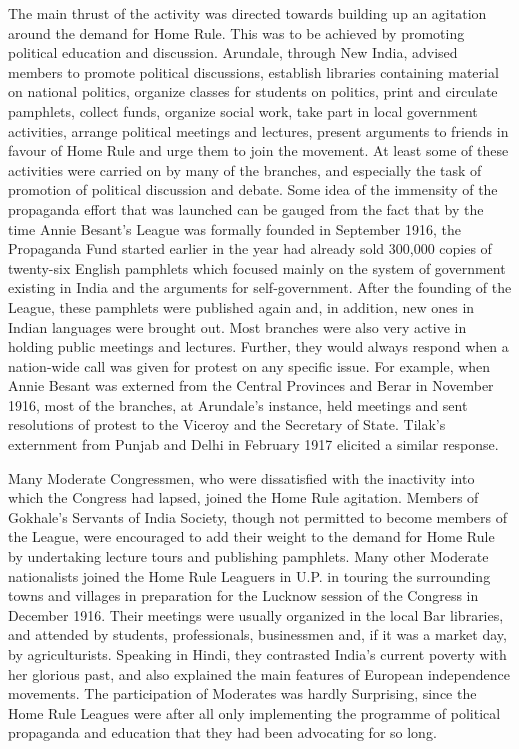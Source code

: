 The main thrust of the activity was directed towards building up an agitation around the demand for Home Rule. This was to be achieved by promoting political education and discussion. Arundale, through New India, advised members to promote political discussions, establish libraries containing material on national politics, organize classes for students on politics, print and circulate pamphlets, collect funds, organize social work, take part in local government activities, arrange political meetings and lectures, present arguments to friends in favour of Home Rule and urge them to join the movement. At least some of these activities were carried on by many of the branches, and especially the task of promotion of political discussion and debate. Some idea of the immensity of the propaganda effort that was launched can be gauged from the fact that by the time Annie Besant's League was formally founded in September 1916, the Propaganda Fund started earlier in the year had already sold 300,000 copies of twenty-six English pamphlets which focused mainly on the system of government existing in India and the arguments for self-government. After the founding of the League, these pamphlets were published again and, in addition, new ones in Indian languages were brought out. Most branches were also very active in holding public meetings and lectures. Further, they would always respond when a nation-wide call was given for protest on any specific issue. For example, when Annie Besant was externed from the Central Provinces and Berar in November 1916, most of the branches, at Arundale's instance, held meetings and sent resolutions of protest to the Viceroy and the Secretary of State. Tilak's externment from Punjab and Delhi in February 1917 elicited a similar response.

Many Moderate Congressmen, who were dissatisfied with the inactivity into which the Congress had lapsed, joined the Home Rule agitation. Members of Gokhale's Servants of India Society, though not permitted to become members of the League, were encouraged to add their weight to the demand for Home Rule by undertaking lecture tours and publishing pamphlets. Many other Moderate nationalists joined the Home Rule Leaguers in U.P. in touring the surrounding towns and villages in preparation for the Lucknow session of the Congress in December 1916. Their meetings were usually organized in the local Bar libraries, and attended by students, professionals, businessmen and, if it was a market day, by agriculturists. Speaking in Hindi, they contrasted India's current poverty with her glorious past, and also explained the main features of European independence movements. The participation of Moderates was hardly Surprising, since the Home Rule Leagues were after all only implementing the programme of political propaganda and education that they had been advocating for so long.

